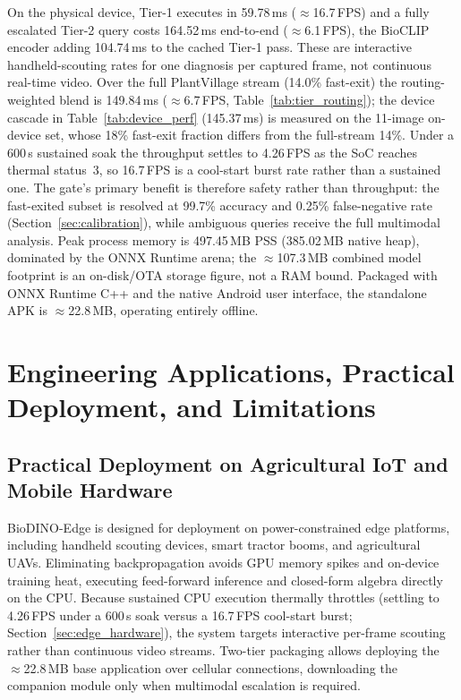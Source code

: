 \documentclass[preprint,12pt]{elsarticle}
\begin{document}
On the physical device, Tier-1 executes in 59.78\,ms ($\approx$16.7\,FPS) and a fully escalated Tier-2 query costs 164.52\,ms end-to-end ($\approx$6.1\,FPS), the BioCLIP encoder adding 104.74\,ms to the cached Tier-1 pass. These are interactive handheld-scouting rates for one diagnosis per captured frame, not continuous real-time video. Over the full PlantVillage stream (14.0\% fast-exit) the routing-weighted blend is 149.84\,ms ($\approx$6.7\,FPS, Table~\ref{tab:tier_routing}); the device cascade in Table~\ref{tab:device_perf} (145.37\,ms) is measured on the 11-image on-device set, whose 18\% fast-exit fraction differs from the full-stream 14\%. Under a 600\,s sustained soak the throughput settles to 4.26\,FPS as the SoC reaches thermal status~3, so 16.7\,FPS is a cool-start burst rate rather than a sustained one. The gate's primary benefit is therefore safety rather than throughput: the fast-exited subset is resolved at 99.7\% accuracy and 0.25\% false-negative rate (Section~\ref{sec:calibration}), while ambiguous queries receive the full multimodal analysis. Peak process memory is 497.45\,MB PSS (385.02\,MB native heap), dominated by the ONNX Runtime arena; the $\approx$107.3\,MB combined model footprint is an on-disk/OTA storage figure, not a RAM bound. Packaged with ONNX Runtime C++ and the native Android user interface, the standalone APK is $\approx$22.8\,MB, operating entirely offline.

\section{Engineering Applications, Practical Deployment, and Limitations}
\label{sec:discussion}

\subsection{Practical Deployment on Agricultural IoT and Mobile Hardware}
BioDINO-Edge is designed for deployment on power-constrained edge platforms, including handheld scouting devices, smart tractor booms, and agricultural UAVs. Eliminating backpropagation avoids GPU memory spikes and on-device training heat, executing feed-forward inference and closed-form algebra directly on the CPU. Because sustained CPU execution thermally throttles (settling to 4.26\,FPS under a 600\,s soak versus a 16.7\,FPS cool-start burst; Section~\ref{sec:edge_hardware}), the system targets interactive per-frame scouting rather than continuous video streams. Two-tier packaging allows deploying the $\approx$22.8\,MB base application over cellular connections, downloading the companion module only when multimodal escalation is required.
\end{document}
